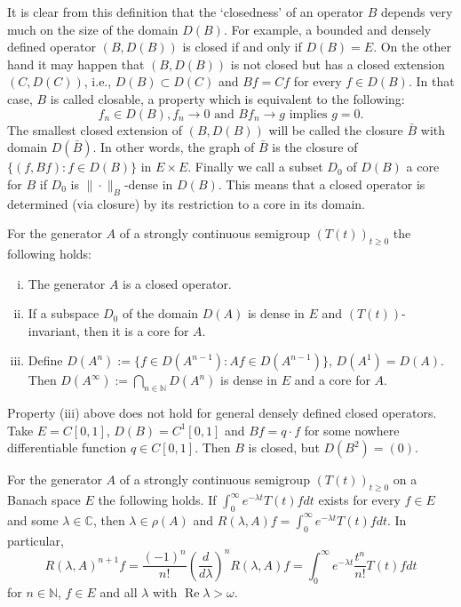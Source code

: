 It is clear from this definition that the \enquote*{closedness} of an operator $B$ depends very much on the size of the domain $D(B)$.
For example, a bounded and densely defined operator $(B,D(B))$ is closed if and only if $D(B) = E$.
On the other hand it may happen that $(B,D(B))$ is not closed but has a closed extension $(C,D(C))$, i.e., $D(B) \subset D(C)$ and $Bf = Cf$ for every $f \in D(B)$.
In that case, $B$ is called closable, a property which is equivalent to the following:
\begin{equation}
f_{n} \in D(B), f_{n} \to 0 \text{ and } Bf_{n} \to g \text{ implies } g = 0.
\end{equation}
The smallest closed extension of $(B,D(B))$ will be called the closure $\bar{B}$ with domain $D(\bar{B})$.
In other words, the graph of $\bar{B}$ is the closure of $\{(f,Bf): f \in D(B)\}$ in $E \times E$.
Finally we call a subset $D_0$ of $D(B)$ a core for $B$ if $D_0$ is $\|\cdot\|_{B}$-dense in $D(B)$.
This means that a closed operator is determined (via closure) by its restriction to a core in its domain.
\begin{proposition}
For the generator $A$ of a strongly continuous semigroup $(T(t))_{t \geq 0}$ the following holds:

\begin{enumerate}[(i)]
\item
The generator $A$ is a closed operator.

\item
If a subspace $D_0$ of the domain $D(A)$ is dense in $E$ and $(T(t))$-invariant, then it is a core for $A$.
\item
Define $D(A^{n}) := \{f \in D(A^{n-1}): Af \in D(A^{n-1})\}$, $D(A^{1}) = D(A)$.
Then $D(A^\infty) := \bigcap_{n \in \mathbb{N}} D(A^{n})$ is dense in $E$ and a core for $A$.

\end{enumerate}
\end{proposition}
\begin{example}
Property (iii) above does not hold for general densely defined closed operators.
Take $E = C[0,1]$, $D(B) = C^{1}[0,1]$ and $Bf = q \cdot f$ for some nowhere differentiable function $q \in C[0,1]$.
Then $B$ is closed, but $D(B^{2}) = (0)$.
\end{example}
\begin{proposition}
For the generator $A$ of a strongly continuous semigroup $(T(t))_{t \geq 0}$ on a Banach space $E$ the following holds.
If $\int_0^\infty e^{-\lambda t}T(t)f dt$ exists for every $f \in E$ and some $\lambda \in \mathbb{C}$, then $\lambda \in \rho(A)$ and $R(\lambda,A)f = \int_0^\infty e^{-\lambda t}T(t)f dt$.
In particular,
\begin{equation}
R(\lambda,A)^{n+1}f = \frac{(-1)^{n}}{n!}\left(\frac{d}{d\lambda}\right)^{n} R(\lambda,A)f = \int_0^\infty e^{-\lambda t}\frac{t^{n}}{n!}T(t)f dt
\end{equation}
for $n \in \mathbb{N}$, $f \in E$ and all $\lambda$ with $\operatorname{Re}\lambda > \omega$.
\end{proposition}
